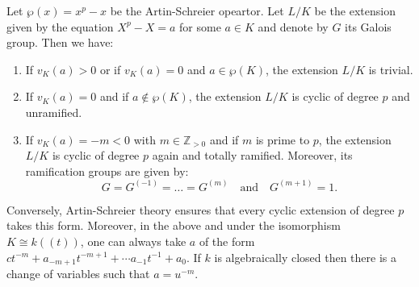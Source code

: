 \begin{theorem}\label{theorem:artin_schreier_ramification}
Let $\wp(x) = x^p - x$ be the Artin-Schreier opeartor.
Let $L/K$ be the extension given by the equation $X^p - X = a$ for some $a \in K$ and denote by $G$ its Galois group. 
Then we have:
\begin{enumerate}
    \item If $v_K(a) > 0$ or if $v_K(a) = 0$ and $a \in \wp(K)$, the extension $L/K$ is trivial.
    \item If $v_K(a) = 0$ and if $a \notin \wp(K)$, the extension $L/K$ is cyclic of degree $p$ and unramified.
    \item If $v_K(a) = -m < 0$ with $m \in \mathbb{Z}_{>0}$ and if $m$ is prime to $p$, the extension $L/K$ is cyclic of degree $p$ again and totally ramified. Moreover,
     its ramification groups are given by:
     $$G = G^{(-1)} = \dots = G^{(m)} \quad \text{and} \quad G^{(m+1)} = 1.$$
\end{enumerate}
Conversely, Artin-Schreier theory ensures that every cyclic extension of degree $p$ takes this form.
Moreover, in the above and under the isomorphism $K \cong k((t))$, one can always take $a$ of the form 
$c t^{-m} + a_{-m + 1} t^{-m + 1} + \cdots a_{-1}t^{-1} + a_0$. If $k$ is algebraically closed then there is a 
change of variables such that $a=u^{-m}$.
\end{theorem}





